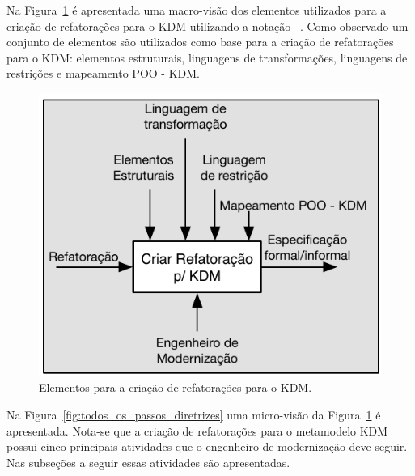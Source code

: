 Na Figura~\ref{fig:diretrizes_kdm_refatoracao_capitulo} é apresentada uma macro-visão dos elementos utilizados para a criação de refatorações para o KDM utilizando a notação ~\cite{Marca_1987}. Como observado um conjunto de elementos são utilizados como base para a criação de refatorações para o KDM: elementos estruturais, linguagens de transformações, linguagens de restrições e mapeamento POO - KDM. 

\begin{figure}[h]
	\centering
	\caption{Elementos para a criação de refatorações para o KDM.}
	\label{fig:diretrizes_kdm_refatoracao_capitulo}
	\includegraphics[scale=0.9]{images/criar_refatoracao_kdm}
	\fautor
\end{figure}


Na Figura~\ref{fig:todos_os_passos_diretrizes} uma micro-visão da Figura~\ref{fig:diretrizes_kdm_refatoracao_capitulo} é apresentada. Nota-se que a criação de refatorações para o metamodelo KDM possui cinco principais atividades que o engenheiro de modernização deve seguir. Nas subseções a seguir essas atividades são apresentadas. %


